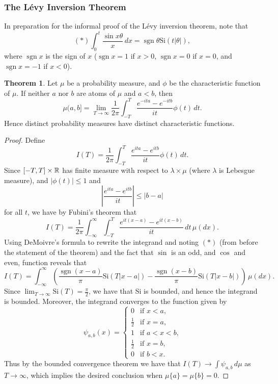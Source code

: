 \documentclass{article}
\theoremstyle{definition}
\newtheorem{theorem}{Theorem}[section]
\newcommand\Si{\text{Si}}
\newcommand\sgn{\mathop{\text{sgn}}\nolimits}
\begin{document}
\subsubsection{The L\'evy Inversion Theorem}

In preparation for the informal proof of the L\'evy inversion theorem, note that
\[ (*) \int_0^t \frac{\sin x\theta}{x} \, dx = \sgn \theta \Si(t|\theta|), \]
where $\sgn x$ is the sign of $x$ ($\sgn x = 1$ if $x > 0$, $\sgn x = 0$ if $x = 0$, and $\sgn x = -1$ if $x < 0$).

\begin{theorem}
Let $\mu$ be a probability measure, and $\phi$ be the characteristic function of $\mu$. If neither $a$ nor $b$ are atoms of $\mu$ and $a < b$, then
\[ \mu (a,b] = \lim_{T \rightarrow \infty} \frac{1}{2\pi} \int_{-T}^T \frac{e^{-ita} - e^{-itb}}{it} \phi(t) \, dt. \]
Hence distinct probability measures have distinct characteristic functions.
\end{theorem}

\begin{proof}
Define
\[ I(T) = \frac{1}{2\pi} \int_{-T}^T \frac{e^{ita} - e^{itb}}{it} \phi(t) \, dt. \]
Since $[-T,T] \times \mathbb{R}$ has finite measure with respect to $\lambda \times \mu$ (where $\lambda$ is Lebesgue measure), and $|\phi(t)| \le 1$ and
\[ \left|\frac{e^{ita} - e^{itb}}{it}\right| \le |b-a| \]
for all $t$, we have by Fubini's theorem that
\[ I(T) = \frac{1}{2\pi} \int_{-\infty}^\infty \int_{-T}^T \frac{e^{it(x-a)} - e^{it(x-b)}}{it} \, dt \, \mu(dx). \]
Using DeMoivre's formula to rewrite the integrand and noting $(*)$ (from before the statement of the theorem) and the fact that $\sin$ is an odd, and $\cos$ and even, function reveals that
\[ I(T) = \int_{-\infty}^\infty \left(\frac{\sgn (x-a)}{\pi} \Si(T|x-a|) - \frac{\sgn (x-b)}{\pi} \Si(T|x-b|)\right) \, \mu(dx). \]
Since $\lim_{T \rightarrow \infty} \Si(T) = \frac{\pi}{2}$, we have that $\Si$ is bounded, and hence the integrand is bounded. Moreover, the integrand converges to the function given by
\[ \psi_{a,b}(x) = \begin{cases} 0 & \text{if $x < a$,} \\
                                 \frac{1}{2} & \text{if $x = a$,} \\
                                 1 & \text{if $a < x < b$,} \\
                                 \frac{1}{2} & \text{if $x = b$,} \\
                                 0 & \text{if $b < x$.} \end{cases} \]
Thus by the bounded convergence theorem we have that $I(T) \rightarrow \int \psi_{a,b} \, d\mu$ as $T \rightarrow \infty$, which implies the desired conclusion when $\mu \{a\} = \mu \{b\} = 0$.
\end{proof}
\end{document}
